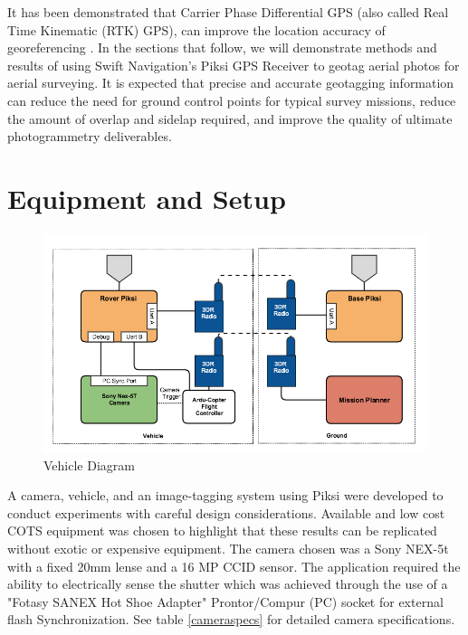 \documentclass{article}
\begin{document}
It has been demonstrated that Carrier Phase Differential GPS (also called Real Time Kinematic (RTK) GPS), can improve the location accuracy of georeferencing \cite{sensefly2}.  In the sections that follow, we will demonstrate methods and results of using Swift Navigation's Piksi GPS Receiver to geotag aerial photos for aerial surveying.  It is expected that precise and accurate geotagging information can reduce the need for ground control points for typical survey missions, reduce the amount of overlap and sidelap required, and improve the quality of ultimate photogrammetry deliverables.

\section{Equipment and Setup}
\label{sec:equipment}
\begin{figure}[h]
\includegraphics[width=7in]{images/flow_charts/uav_piksi_flow_chart.png}
\caption{Vehicle Diagram}
\label{figure:vehicle-diagram}
\end{figure}

\label{sec:equipment}
A camera, vehicle, and an image-tagging system using Piksi were developed to conduct experiments with careful design considerations.  Available and low cost COTS equipment was chosen to highlight that these results can be replicated without exotic or expensive equipment.  The camera chosen was a Sony NEX-5t with a fixed 20mm lense and a 16 MP CCID sensor.  The application required the ability to electrically sense the shutter which was achieved through the use of a "Fotasy SANEX Hot Shoe Adapter" Prontor/Compur (PC) socket for external flash Synchronization.  See table \ref{cameraspecs} for detailed camera specifications.
\end{document}
